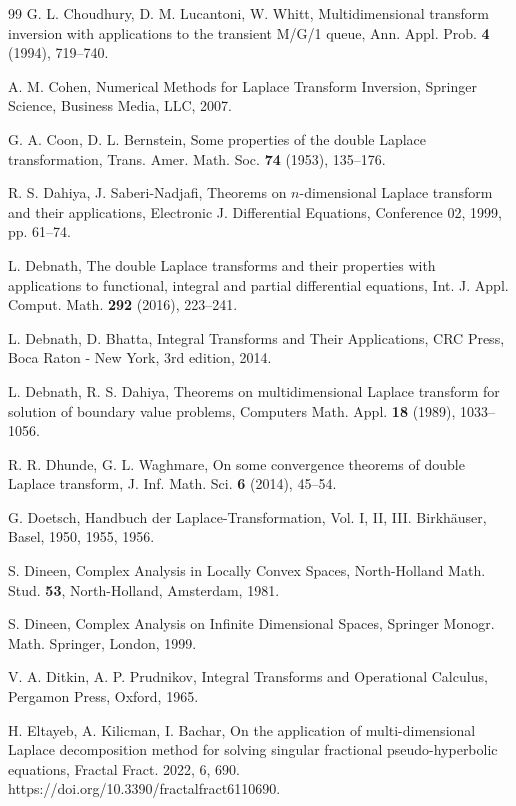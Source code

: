 \documentclass{amsart}
\theoremstyle{definition}
\theoremstyle{remark}
\numberwithin{equation}{section}
\begin{document}
\begin{thebibliography}{99}
G. L. Choudhury, D. M. Lucantoni, W. Whitt,
Multidimensional transform inversion with applications to the transient M/G/1 queue,
Ann. Appl. Prob. {\bf 4} (1994), 719--740.

A. M. Cohen, 
Numerical Methods for Laplace Transform Inversion,
Springer Science, Business Media, LLC, 2007.

 G. A. Coon, D. L. Bernstein,
Some properties of the double Laplace transformation,
Trans. Amer. Math. Soc. {\bf 74} (1953), 135--176.

R. S. Dahiya, J. Saberi-Nadjafi,
Theorems on $n$-dimensional Laplace transform and their applications, 
Electronic J. Differential Equations, Conference 02, 1999, pp. 61--74. 

L. Debnath, 
The double Laplace transforms and their properties with applications to functional, integral and partial differential equations,
Int. J. Appl. Comput. Math. {\bf 292} (2016), 223--241.

L. Debnath, D. Bhatta, 
Integral Transforms and Their Applications, CRC Press,
Boca Raton - New York, 3rd edition, 2014.

L. Debnath, R. S. Dahiya,  
Theorems on multidimensional Laplace transform for solution of
boundary value problems,
Computers Math. Appl. {\bf 18} (1989), 1033--1056.

R. R. Dhunde, G. L. Waghmare,
On some convergence theorems
of double Laplace transform,
J. Inf. Math. Sci. {\bf 6} (2014), 45--54.

G. Doetsch,
Handbuch der Laplace-Transformation, Vol. I, II, III.
Birkh\"auser, Basel, 1950, 1955, 1956.

S. Dineen, 
Complex Analysis in Locally Convex Spaces, 
North-Holland Math.
Stud. {\bf 53}, North-Holland, Amsterdam, 1981.

S. Dineen, 
Complex Analysis on Infinite Dimensional Spaces,
Springer Monogr.
Math. Springer, London, 1999. 

V. A.
Ditkin, A. P. Prudnikov, 
Integral Transforms and Operational Calculus, Pergamon
Press, Oxford, 1965.

H. Eltayeb, A. Kilicman, I. Bachar,
On the application
of multi-dimensional Laplace
decomposition method for
solving singular fractional
pseudo-hyperbolic equations,
Fractal Fract. 2022, 6, 690. https://doi.org/10.3390/fractalfract6110690.


\end{thebibliography}
\end{document}
